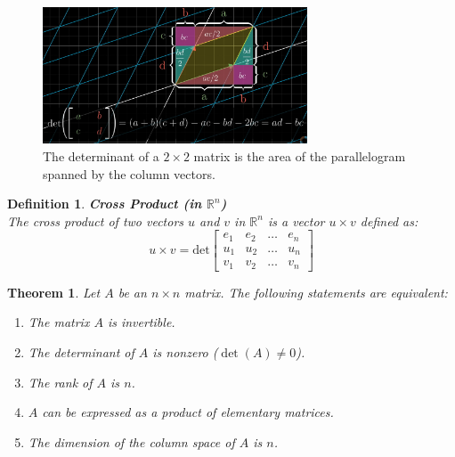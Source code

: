 \documentclass[11pt]{book} %
\newtheorem{theorem}{Theorem}[section]
\newtheorem{definition}{Definition}[section]
\begin{document}
\begin{figure}[H]
    \centering
    \includegraphics[width=0.7\textwidth]{Figs/determinant_in_R2.png}
    \caption{The determinant of a \( 2 \times 2 \) matrix is the area of the parallelogram spanned by the column vectors.}
\end{figure}

\begin{definition}{\textbf{Cross Product (in $\mathbb{R}^n$)}} \\
    The cross product of two vectors \( u \) and \( v \) in \( \mathbb{R}^n \) is a vector \( u \times v \) defined as:
    \[
    u \times v = \text{det} \begin{bmatrix} e_1 & e_2 & \dots & e_n \\ u_1 & u_2 & \dots & u_n \\ v_1 & v_2 & \dots & v_n \end{bmatrix}
    \]
\end{definition}

\begin{theorem}
Let \( A \) be an \( n \times n \) matrix. The following statements are equivalent:
\begin{enumerate}
    \item The matrix \( A \) is invertible.
    \item The determinant of \( A \) is nonzero (\( \det(A) \neq 0 \)).
    \item The rank of \( A \) is \( n \).
    \item \( A \) can be expressed as a product of elementary matrices.
    \item The dimension of the column space of \( A \) is \( n \).
\end{enumerate}
\end{theorem}
\end{document}
